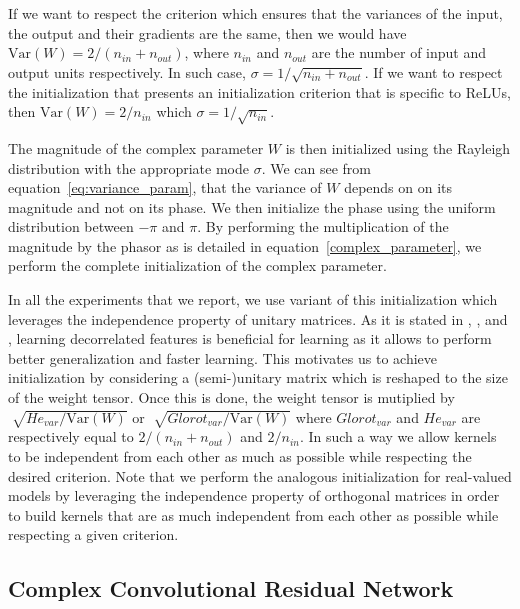 \documentclass{article}
\begin{document}
If we want to respect the \citet{glorot2010understanding} criterion which ensures that the variances of the input, the output and their gradients are the same, then we would have $\mathrm{Var}(W) = 2 / (n_{in} + n_{out})$, where $n_{in}$ and $n_{out}$ are the number of input and output units respectively. In such case, $\sigma = 1 / \sqrt{n_{in} + n_{out}}$. If we want to respect the \citet{he2015delving} initialization that presents an initialization criterion that is specific to ReLUs, then $\mathrm{Var}(W) = 2 / n_{in}$ which $\sigma = 1/\sqrt{n_{in}}$.

The magnitude of the complex parameter $W$ is then initialized using the Rayleigh distribution with the appropriate mode $\sigma$. 
We can see from equation~\ref{eq:variance_param}, that the variance of $W$ depends on on its magnitude and not on its phase. We then initialize the phase using the uniform distribution between $-\pi$ and $\pi$.
By performing the multiplication of the magnitude by the phasor as is detailed in equation~\ref{complex_parameter}, we perform the complete initialization of the complex parameter.

In all the experiments that we report, we use variant of this initialization which leverages the independence property of unitary matrices. As it is stated in \citet{cogswell2015reducing}, \citet{srivastava2014dropout}, and \citet{tompson2015efficient}, learning decorrelated features is beneficial for learning as it allows to perform better generalization and faster learning. This motivates us to achieve initialization by considering a (semi-)unitary matrix which is reshaped to the size of the weight tensor. Once this is done, the weight tensor is mutiplied by $\sqrt[]{{He_{var}}/{\mathrm{Var(\mathit{W})}}}$ or $\sqrt[]{{Glorot_{var}}/{\mathrm{Var(\mathit{W})}}}$ where $Glorot_{var}$ and $He_{var}$ are respectively equal to $2 / (n_{in} + n_{out})$ and $2 / n_{in}$. In such a way we allow kernels to be independent from each other as much as possible while respecting the desired criterion. Note that we perform the analogous initialization for real-valued models by leveraging the independence property of orthogonal matrices in order to build kernels that are as much independent from each other as possible while respecting a given criterion. 

\subsection{Complex Convolutional Residual Network} \label{ccrn}
\end{document}
